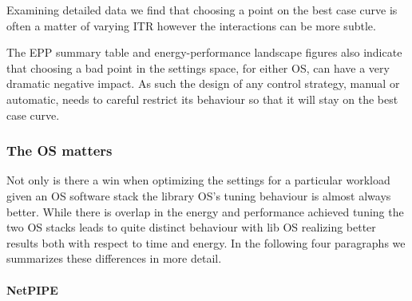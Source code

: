 Examining detailed data we find that choosing a point on the best case curve is often a matter of varying ITR however the interactions can be more subtle. 

The EPP summary table and energy-performance landscape figures also indicate that choosing a bad point in the settings space, for either OS, can have a very dramatic negative impact. As such the design of any control strategy, manual or automatic, needs to careful restrict its behaviour so that it will stay on the best case curve.  


\subsubsection{The OS matters}

Not only is there a win when optimizing the settings for a particular workload given an OS software stack  the library OS's tuning behaviour is almost always better.  While there is overlap in the energy and performance achieved tuning the two OS stacks leads to quite distinct behaviour with lib OS realizing better results both with respect to time and energy.  In the following four paragraphs we summarizes these differences in more detail.

\paragraph{NetPIPE}

